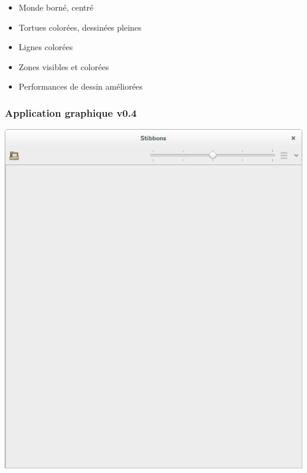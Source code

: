 \begin{frame}
\begin{itemize}
	\item Monde borné, centré
	\item Tortues colorées, dessinées pleines
	\item Lignes colorées
	\item Zones visibles et colorées
	\item Performances de dessin améliorées
\end{itemize}
\end{frame}

\begin{frame}
\frametitle{Application graphique v0.4}
\begin{center}
\includegraphics[scale=0.16]{doc/report/screenshot/stibbons-0-4-1.png}
~~~~~~~~

\end{center}
\end{frame}

